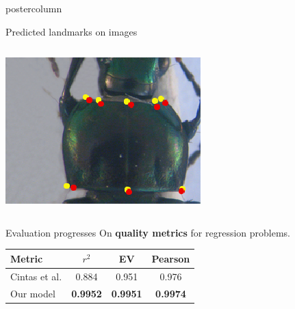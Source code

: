 \begin{frame}
\begin{columns}
\begin{column}{.49\textwidth}
\begin{beamercolorbox}[center,wd=\textwidth]{postercolumn}
\begin{minipage}[T]{.95\textwidth}
{\begin{block}{Predicted landmarks on images}
\begin{columns}
\begin{column}{.45\textwidth}
            			\includegraphics[width=.97\textwidth]{images/Prono_036.eps}
            		\end{column}
            	\end{columns}
            \end{block}
            
            \vfill
            
            \begin{block}{Evaluation progresses}
            On \textbf{quality metrics} for regression problems. \\[0.2cm]
            \begin{center}
           		\begin{tabular}{|l|c|c|c|}
            		\hline
            		Metric\footnotemark[1] & $r^2$ & EV & Pearson \\ \hline
            		Cintas et al. & 0.884 & 0.951 & 0.976 \\ \hline
            		Our model & \textbf{0.9952} & \textbf{0.9951} & \textbf{0.9974} \\ \hline
            	\end{tabular}            
            	
            \end{center}
            

\end{block}}
\end{minipage}
\end{beamercolorbox}
\end{column}
\end{columns}
\end{frame}
